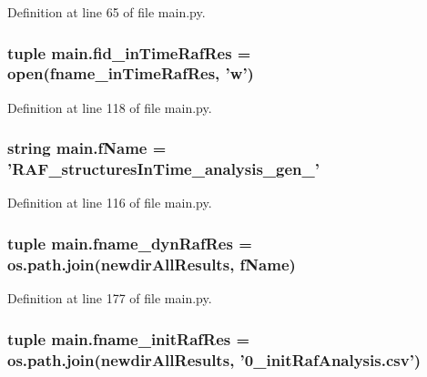 Definition at line 65 of file main.\-py.

\hypertarget{a00151_ab82095abcedb97b7abf8e003f4724d0c}{
\subsubsection[{fid\-\_\-in\-Time\-Raf\-Res}]{\setlength{\rightskip}{0pt plus 5cm}tuple main.\-fid\-\_\-in\-Time\-Raf\-Res = open({\bf fname\-\_\-in\-Time\-Raf\-Res}, 'w')}}\label{a00151_ab82095abcedb97b7abf8e003f4724d0c}


Definition at line 118 of file main.\-py.

\hypertarget{a00151_a9fff4b23f9489649601960dabc4a6cdd}{
\subsubsection[{f\-Name}]{\setlength{\rightskip}{0pt plus 5cm}string main.\-f\-Name = 'R\-A\-F\-\_\-structures\-In\-Time\-\_\-analysis\-\_\-gen\-\_\-'}}\label{a00151_a9fff4b23f9489649601960dabc4a6cdd}


Definition at line 116 of file main.\-py.

\hypertarget{a00151_a6a031fb0c5a0a5519fc4c3f6d7ef35d1}{
\subsubsection[{fname\-\_\-dyn\-Raf\-Res}]{\setlength{\rightskip}{0pt plus 5cm}tuple main.\-fname\-\_\-dyn\-Raf\-Res = os.\-path.\-join({\bf newdir\-All\-Results}, {\bf f\-Name})}}\label{a00151_a6a031fb0c5a0a5519fc4c3f6d7ef35d1}


Definition at line 177 of file main.\-py.

\hypertarget{a00151_a72ed3f9434cc4dcc2240c6ca408960ff}{
\subsubsection[{fname\-\_\-init\-Raf\-Res}]{\setlength{\rightskip}{0pt plus 5cm}tuple main.\-fname\-\_\-init\-Raf\-Res = os.\-path.\-join({\bf newdir\-All\-Results}, '0\-\_\-init\-Raf\-Analysis.\-csv')}}\label{a00151_a72ed3f9434cc4dcc2240c6ca408960ff}


